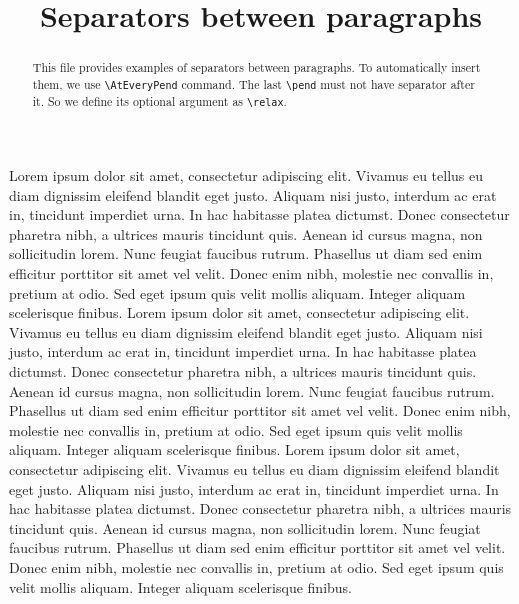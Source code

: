 \documentclass{article}
\begin{document}
\begin{english}
\date{}
\title{Separators between paragraphs}
\maketitle
\begin{abstract}
This file provides examples of separators between paragraphs.
To automatically insert them, we use \verb+\AtEveryPend+ command.
The last \verb+\pend+ must not have separator after it. So we define its optional argument as \verb+\relax+.

\end{abstract}
\end{english}

\begin{pages}
\begin{Rightside}
\beginnumbering
\pstart
Lorem ipsum dolor sit amet, consectetur adipiscing elit. Vivamus eu tellus eu diam dignissim eleifend blandit eget justo. Aliquam nisi justo, interdum ac erat in, tincidunt imperdiet urna. In hac habitasse platea dictumst. Donec consectetur pharetra nibh, a ultrices mauris tincidunt quis. Aenean id cursus magna, non sollicitudin lorem. Nunc feugiat faucibus rutrum. Phasellus ut diam sed enim efficitur porttitor sit amet vel velit. Donec enim nibh, molestie nec convallis in, pretium at odio. Sed eget ipsum quis velit mollis aliquam. Integer aliquam scelerisque finibus.
\pend
\pstart
Lorem ipsum dolor sit amet, consectetur adipiscing elit. Vivamus eu tellus eu diam dignissim eleifend blandit eget justo. Aliquam nisi justo, interdum ac erat in, tincidunt imperdiet urna. In hac habitasse platea dictumst. Donec consectetur pharetra nibh, a ultrices mauris tincidunt quis. Aenean id cursus magna, non sollicitudin lorem. Nunc feugiat faucibus rutrum. Phasellus ut diam sed enim efficitur porttitor sit amet vel velit. Donec enim nibh, molestie nec convallis in, pretium at odio. Sed eget ipsum quis velit mollis aliquam. Integer aliquam scelerisque finibus.
\pend
\pstart
Lorem ipsum dolor sit amet, consectetur adipiscing elit. Vivamus eu tellus eu diam dignissim eleifend blandit eget justo. Aliquam nisi justo, interdum ac erat in, tincidunt imperdiet urna. In hac habitasse platea dictumst. Donec consectetur pharetra nibh, a ultrices mauris tincidunt quis. Aenean id cursus magna, non sollicitudin lorem. Nunc feugiat faucibus rutrum. Phasellus ut diam sed enim efficitur porttitor sit amet vel velit. Donec enim nibh, molestie nec convallis in, pretium at odio. Sed eget ipsum quis velit mollis aliquam. Integer aliquam scelerisque finibus.

\end{Rightside}
\end{pages}
\end{document}
